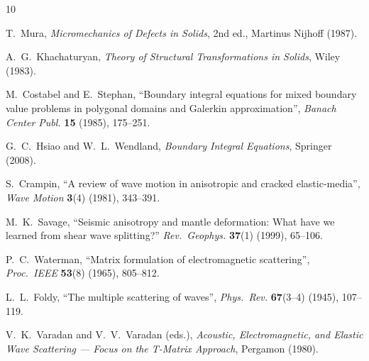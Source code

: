 \documentclass[11pt,a4paper]{article}
\theoremstyle{plain}
\theoremstyle{definition}
\theoremstyle{remark}
\begin{document}

\begin{thebibliography}{10}

 T.\ Mura, \emph{Micromechanics of Defects in Solids},
  2nd ed., Martinus Nijhoff (1987).

 A.\ G.\ Khachaturyan, \emph{Theory of Structural
  Transformations in Solids}, Wiley (1983).

 M.\ Costabel and E.\ Stephan, ``Boundary
  integral equations for mixed boundary value problems in polygonal
  domains and Galerkin approximation'', \emph{Banach Center Publ.}
  \textbf{15} (1985), 175--251.

 G.\ C.\ Hsiao and W.\ L.\ Wendland,
  \emph{Boundary Integral Equations}, Springer (2008).

 S.\ Crampin, ``A review of wave motion in
  anisotropic and cracked elastic-media'',
  \emph{Wave Motion} \textbf{3}(4) (1981), 343--391.

 M.\ K.\ Savage, ``Seismic anisotropy and mantle
  deformation: What have we learned from shear wave splitting?''
  \emph{Rev.\ Geophys.} \textbf{37}(1) (1999), 65--106.

 P.\ C.\ Waterman, ``Matrix formulation of
  electromagnetic scattering'', \emph{Proc.\ IEEE} \textbf{53}(8)
  (1965), 805--812.

 L.\ L.\ Foldy, ``The multiple scattering of
  waves'', \emph{Phys.\ Rev.} \textbf{67}(3--4) (1945), 107--119.

 V.\ K.\ Varadan and V.\ V.\ Varadan (eds.),
  \emph{Acoustic, Electromagnetic, and Elastic Wave Scattering ---
  Focus on the T-Matrix Approach}, Pergamon (1980).

\end{thebibliography}
\end{document}

